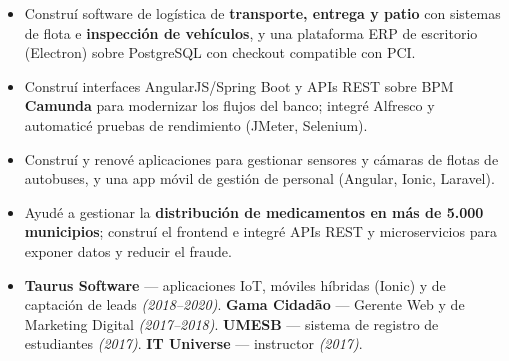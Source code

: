 \documentclass[10pt,a4paper]{altacv}
\begin{document}
\begin{itemize}
\item Construí software de logística de \textbf{transporte, entrega y patio} con sistemas de flota e \textbf{inspección de vehículos}, y una plataforma ERP de escritorio (Electron) sobre PostgreSQL con checkout compatible con PCI.
\end{itemize}
\divider

\begin{itemize}
\item Construí interfaces AngularJS/Spring Boot y APIs REST sobre BPM \textbf{Camunda} para modernizar los flujos del banco; integré Alfresco y automaticé pruebas de rendimiento (JMeter, Selenium).
\end{itemize}
\divider

\begin{itemize}
\item Construí y renové aplicaciones para gestionar sensores y cámaras de flotas de autobuses, y una app móvil de gestión de personal (Angular, Ionic, Laravel).
\end{itemize}
\divider

\begin{itemize}
\item Ayudé a gestionar la \textbf{distribución de medicamentos en más de 5.000 municipios}; construí el frontend e integré APIs REST y microservicios para exponer datos y reducir el fraude.
\end{itemize}

\begin{itemize}
\item \textbf{Taurus Software} — aplicaciones IoT, móviles híbridas (Ionic) y de captación de leads \emph{(2018--2020)}. \quad \textbf{Gama Cidadão} — Gerente Web y de Marketing Digital \emph{(2017--2018)}. \quad \textbf{UMESB} — sistema de registro de estudiantes \emph{(2017)}. \quad \textbf{IT Universe} — instructor \emph{(2017)}.
\end{itemize}
\end{document}
